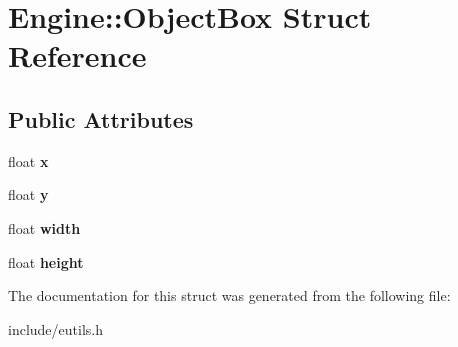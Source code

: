 \hypertarget{structEngine_1_1ObjectBox}{}\section{Engine\+:\+:Object\+Box Struct Reference}
\label{structEngine_1_1ObjectBox}
\subsection*{Public Attributes}
\begin{DoxyCompactItemize}
\item 
\hypertarget{structEngine_1_1ObjectBox_ae323909f489e2f65ca11cdc8d54b7e66}{}float {\bfseries x}\label{structEngine_1_1ObjectBox_ae323909f489e2f65ca11cdc8d54b7e66}

\item 
\hypertarget{structEngine_1_1ObjectBox_a625f072b29b3c33d42c9c8a20e325bf2}{}float {\bfseries y}\label{structEngine_1_1ObjectBox_a625f072b29b3c33d42c9c8a20e325bf2}

\item 
\hypertarget{structEngine_1_1ObjectBox_a098cbccee47677bda8356351a7052d92}{}float {\bfseries width}\label{structEngine_1_1ObjectBox_a098cbccee47677bda8356351a7052d92}

\item 
\hypertarget{structEngine_1_1ObjectBox_a572e1eed2456dd5d1e27a35e1174c404}{}float {\bfseries height}\label{structEngine_1_1ObjectBox_a572e1eed2456dd5d1e27a35e1174c404}

\end{DoxyCompactItemize}


The documentation for this struct was generated from the following file\+:\begin{DoxyCompactItemize}
\item 
include/eutils.\+h\end{DoxyCompactItemize}
